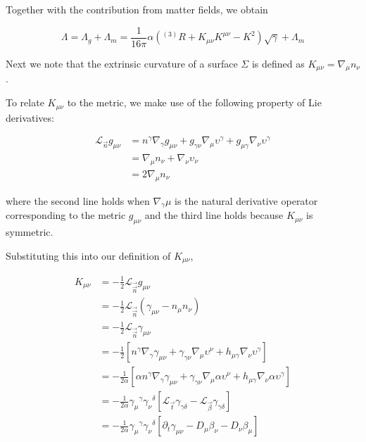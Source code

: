 {    Together with the contribution from matter fields, we obtain
    
    \begin{equation}
    \Lambda = \Lambda_g+\Lambda_m= \frac{1}{16\pi}\alpha({^{(3)}R} + K_{\mu\nu}K^{\mu\nu} - K^2)\sqrt{\gamma}+\Lambda_m
    \end{equation}
    
    Next we note that the extrinsic curvature of a
    surface $\Sigma$ is defined as $K_{\mu\nu} = \nabla_{\mu}n_{\nu}$. 
    
    To relate $K_{\mu\nu}$ to the metric, we make use of the following property of Lie derivatives:
    
    \begin{align}
    \mathcal{L}_{\vec{n}}g_{\mu\nu} &= n^{\gamma}\nabla_{\gamma}g_{\mu\nu} + g_{\gamma\nu}\nabla_{\mu}\upsilon^{\gamma} + g_{\mu\gamma}\nabla_{\nu}\upsilon^{\gamma} \\
    &= \nabla_{\mu}n_{\nu}+\nabla_{\nu}\upsilon_{\nu} \\
    &=2\nabla_{\mu}n_{\nu}
    \end{align}
    
    where the second line holds when $\nabla_{\gamma}\mu$ is the natural derivative operator corresponding to the metric $g_{\mu\nu}$ and the third line holds because $K_{\mu\nu}$ is symmetric.
    
    Substituting this into our definition of $K_{\mu\nu}$,
    
    \begin{align}
    K_{\mu\nu} &= -\frac{1}{2}\mathcal{L}_{\vec{\vec{n}}}g_{\mu\nu} \\
    &= -\frac{1}{2}\mathcal{L}_{\vec{\vec{n}}}(\gamma_{\mu\nu}-n_{\mu}n_{\nu}) \\
    &= -\frac{1}{2}\mathcal{L}_{\vec{\vec{n}}}\gamma_{\mu\nu} \\
    &= -\frac{1}{2}[n^{\gamma}\nabla_{\gamma}\gamma_{\mu\nu} + \gamma_{\gamma\nu}\nabla_{\mu}\upsilon^{\nu} + h_{\mu\gamma}\nabla_{\nu}\upsilon^{\gamma}] \\
    &= -\frac{1}{2\alpha}[\alpha n^{\gamma}\nabla_{\gamma}\gamma_{\mu\nu} + \gamma_{\gamma\nu}\nabla_{\mu}\alpha\upsilon^{\nu} + h_{\mu\gamma}\nabla_{\nu}\alpha\upsilon^{\gamma}] \\
    &= -\frac{1}{2\alpha}{\gamma_{\mu}}^{\gamma}{\gamma_{\nu}}^{\delta}[\mathcal{L}_{\vec{t}}\gamma_{\gamma\delta}-\mathcal{L}_{\vec{\beta}}\gamma_{\gamma\delta}] \\
    &= -\frac{1}{2\alpha}{\gamma_{\mu}}^{\gamma}{\gamma_{\nu}}^{\delta}[\partial_t\gamma_{\mu\nu}-D_{\mu}\beta_{\nu}-D_{\nu}\beta_{\mu}]
    \end{align}
    
}
